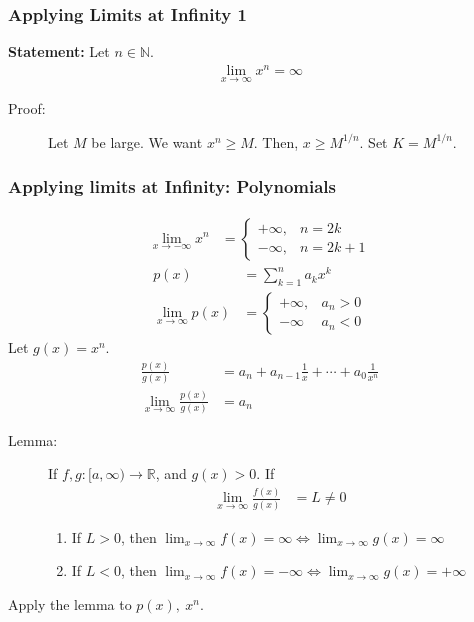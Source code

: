 \documentclass[10pt]{extarticle}
\newcommand{\N}{\mathbb{N}}
\newcommand{\R}{\mathbb{R}}
\begin{document}
    \subsubsection{Applying Limits at Infinity 1}%
      \textbf{Statement:} Let $n\in \N$.
      \begin{align*}
        \lim_{x\rightarrow\infty}x^{n} = \infty
      \end{align*}

      \begin{description}
        \item[Proof:] Let $M$ be large. We want $x^{n} \geq M$. Then, $x\geq M^{1/n}$. Set $K = M^{1/n}$.
      \end{description}
      \subsubsection{Applying limits at Infinity: Polynomials}%
    \begin{align*}
      \lim_{x\rightarrow -\infty}x^{n} &= \begin{cases}
        +\infty,&n = 2k\\
        -\infty,& n= 2k+1
      \end{cases}
    \end{align*}
    \begin{align*}
      p(x) &= \sum_{k=1}^{n}a_kx^k\\
      \lim_{x\rightarrow\infty}p(x) &= \begin{cases}
        +\infty,&a_n > 0\\
        -\infty&a_n < 0
      \end{cases}
    \end{align*}
    Let $g(x) = x^n$.
    \begin{align*}
      \frac{p(x)}{g(x)} &= a_n + a_{n-1}\frac{1}{x} + \cdots + a_{0}\frac{1}{x^n}\\
      \lim_{x\rightarrow\infty}\frac{p(x)}{g(x)} &= a_n
    \end{align*}
    \begin{description}
      \item[Lemma:]If $f,g: [a,\infty)\rightarrow \R$, and $g(x) > 0$. If
      \begin{align*}
        \lim_{x\rightarrow \infty}\frac{f(x)}{g(x)} &= L \neq 0
      \end{align*}
      \begin{enumerate}[(1)]
        \item If $L > 0$, then $\lim_{x\rightarrow\infty} f(x) = \infty \Leftrightarrow \lim_{x\rightarrow\infty}g(x) = \infty$
        \item If $L < 0$, then $\lim_{x\rightarrow\infty} f(x)= -\infty \Leftrightarrow \lim_{x\rightarrow\infty}g(x) = +\infty$
      \end{enumerate}
    \end{description}
    Apply the lemma to $p(x),~x^n$.
\end{document}
